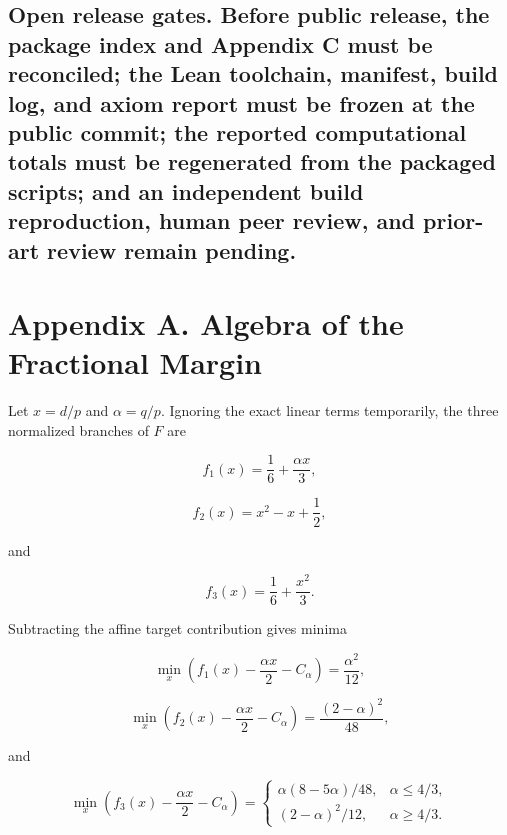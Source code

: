 \documentclass[
  11pt,
]{article}
\begin{document}
\subsection{\texorpdfstring{\textbf{Open release gates.} Before public release, the package index and Appendix C must be reconciled; the Lean toolchain, manifest, build log, and axiom report must be frozen at the public commit; the reported computational totals must be regenerated from the packaged scripts; and an independent build reproduction, human peer review, and prior-art review remain pending.}{Open release gates. Before public release, the package index and Appendix C must be reconciled; the Lean toolchain, manifest, build log, and axiom report must be frozen at the public commit; the reported computational totals must be regenerated from the packaged scripts; and an independent build reproduction, human peer review, and prior-art review remain pending.}}\label{open-release-gates.-before-public-release-the-package-index-and-appendix-c-must-be-reconciled-the-lean-toolchain-manifest-build-log-and-axiom-report-must-be-frozen-at-the-public-commit-the-reported-computational-totals-must-be-regenerated-from-the-packaged-scripts-and-an-independent-build-reproduction-human-peer-review-and-prior-art-review-remain-pending.}

\section{Appendix A. Algebra of the Fractional Margin}\label{appendix-a.-algebra-of-the-fractional-margin}

Let \(x=d/p\) and \(\alpha=q/p\). Ignoring the exact linear terms temporarily, the three normalized branches of \(F\) are

\[
f_1(x)=\frac16+\frac{\alpha x}{3},
\]

\[
f_2(x)=x^2-x+\frac12,
\]

and

\[
f_3(x)=\frac16+\frac{x^2}{3}.
\]

Subtracting the affine target contribution gives minima

\[
\min_x\left(f_1(x)-\frac{\alpha x}{2}-C_\alpha\right)
=
\frac{\alpha^2}{12},
\]

\[
\min_x\left(f_2(x)-\frac{\alpha x}{2}-C_\alpha\right)
=
\frac{(2-\alpha)^2}{48},
\]

and

\[
\min_x\left(f_3(x)-\frac{\alpha x}{2}-C_\alpha\right)
=
\begin{cases}
\alpha(8-5\alpha)/48,&\alpha\le4/3,\\
(2-\alpha)^2/12,&\alpha\ge4/3.
\end{cases}
\]
\end{document}
